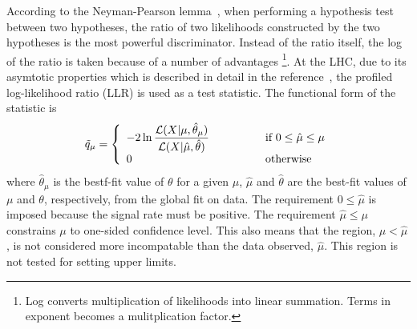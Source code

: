 %
According to the Neyman-Pearson lemma~\cite{neymanpearson}, 
when performing a hypothesis test between two hypotheses,
the ratio of two likelihoods constructed by the two hypotheses
is the most powerful discriminator. Instead of the ratio itself, 
the log of the ratio is taken because of a number of advantages
\footnote{Log converts multiplication of likelihoods into linear summation. 
Terms in exponent becomes a mulitplication factor.}.  
At the LHC, due to its asymtotic properties which is described in detail 
in the reference~\cite{cowan_asimov}, 
the profiled log-likelihood ratio (LLR) is used as a test statistic.   
The functional form of the statistic is 
\begin{eqnarray} 
\tilde{q}_\mu 
= 
\left\{ \begin{array}{l l}
\displaystyle
-2 \ln \frac{\mathcal{L} ( X | \mu, \hat{\theta}_\mu)}
            {\mathcal{L} ( X | \hat{\mu}, \hat{\theta})}  
            & \quad \quad \quad \quad \textrm{if } 0 \le \hat{\mu} \le \mu \\
0           & \quad \quad \quad \quad \textrm{otherwise}
\end{array} \right.
\end{eqnarray}  
where $\hat{\theta}_\mu$ is the bestf-fit value of $\theta$ for a given $\mu$, 
$\hat{\mu}$ and $\hat{\theta}$ are the best-fit values of 
$\mu$ and $\theta$, respectively, from the global fit on data.
The requirement $0 \le \hat{\mu}$ is imposed because the signal rate must be positive. 
The requirement $\hat{\mu} \le \mu$ constrains $\mu$ to one-sided confidence level. 
This also means that the region, $\mu < \hat{\mu}$, is not considered  
more incompatable than the data observed, $\hat{\mu}$. This region 
is not tested for setting upper limits.
%

